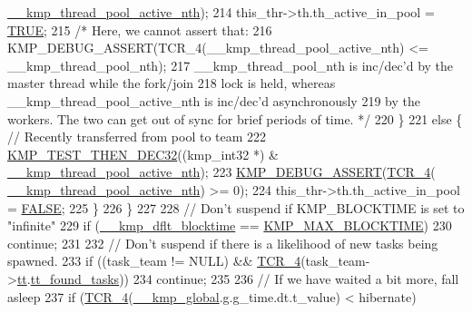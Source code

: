 \begin{DoxyCode}
{{      \hyperlink{kmp_8h_adeeafca09cd1560dcc9bc78ee1df217d}{\_\_kmp\_thread\_pool\_active\_nth});
214                 this\_thr->th.th\_active\_in\_pool = \hyperlink{kmp_8h_aa8cecfc5c5c054d2875c03e77b7be15d}{TRUE};
215                 \textcolor{comment}{/* Here, we cannot assert that:}
216 \textcolor{comment}{                   KMP\_DEBUG\_ASSERT(TCR\_4(\_\_kmp\_thread\_pool\_active\_nth) <= \_\_kmp\_thread\_pool\_nth);}
217 \textcolor{comment}{                   \_\_kmp\_thread\_pool\_nth is inc/dec'd by the master thread while the fork/join}
218 \textcolor{comment}{                   lock is held, whereas \_\_kmp\_thread\_pool\_active\_nth is inc/dec'd asynchronously}
219 \textcolor{comment}{                   by the workers.  The two can get out of sync for brief periods of time.  */}
220             \}
221             \textcolor{keywordflow}{else} \{ \textcolor{comment}{// Recently transferred from pool to team}
222                 \hyperlink{kmp__os_8h_a5b23523b95ee4b2307a8f344cbbe8050}{KMP\_TEST\_THEN\_DEC32}((kmp\_int32 *) &
      \hyperlink{kmp_8h_adeeafca09cd1560dcc9bc78ee1df217d}{\_\_kmp\_thread\_pool\_active\_nth});
223                 \hyperlink{kmp__debug_8h_ad766efc30e33e28634691088e80cdf08}{KMP\_DEBUG\_ASSERT}(\hyperlink{kmp__os_8h_acd6256e4afba32d90997235fc0a38a74}{TCR\_4}(
      \hyperlink{kmp_8h_adeeafca09cd1560dcc9bc78ee1df217d}{\_\_kmp\_thread\_pool\_active\_nth}) >= 0);
224                 this\_thr->th.th\_active\_in\_pool = \hyperlink{kmp_8h_aa93f0eb578d23995850d61f7d61c55c1}{FALSE};
225             \}
226         \}
227 
228         \textcolor{comment}{// Don't suspend if KMP\_BLOCKTIME is set to "infinite"}
229         \textcolor{keywordflow}{if} (\hyperlink{kmp_8h_a3b56e2e90e1539c0b794e4137724bc1c}{\_\_kmp\_dflt\_blocktime} == \hyperlink{kmp_8h_a1ca6c6ce04115f143dc5df627de57958}{KMP\_MAX\_BLOCKTIME})
230             \textcolor{keywordflow}{continue};
231 
232         \textcolor{comment}{// Don't suspend if there is a likelihood of new tasks being spawned.}
233         \textcolor{keywordflow}{if} ((task\_team != NULL) && \hyperlink{kmp__os_8h_acd6256e4afba32d90997235fc0a38a74}{TCR\_4}(task\_team->\hyperlink{unionkmp__task__team_a18728e49ce76f29250a4be77cd7a2ff4}{tt}.\hyperlink{structkmp__base__task__team_afb1c5ccacb58cdd0dd0895e4d535c120}{tt\_found\_tasks}))
234             \textcolor{keywordflow}{continue};
235 
236         \textcolor{comment}{// If we have waited a bit more, fall asleep}
237         \textcolor{keywordflow}{if} (\hyperlink{kmp__os_8h_acd6256e4afba32d90997235fc0a38a74}{TCR\_4}(\hyperlink{kmp_8h_a11b71922a4df46ff9e8dbc68693e8d67}{\_\_kmp\_global}.g.g\_time.dt.t\_value) < hibernate)
}}
\end{DoxyCode}
